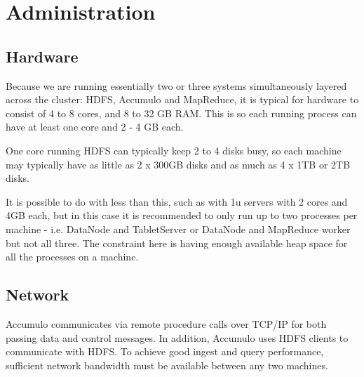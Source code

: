 
%
%

\chapter{Administration}

\section{Hardware}

Because we are running essentially two or three systems simultaneously layered
across the cluster: HDFS, Accumulo and MapReduce, it is typical for hardware to
consist of 4 to 8 cores, and 8 to 32 GB RAM. This is so each running process can have
at least one core and 2 - 4 GB each.

One core running HDFS can typically keep 2 to 4 disks busy, so each machine may
typically have as little as 2 x 300GB disks and as much as 4 x 1TB or 2TB disks.

It is possible to do with less than this, such as with 1u servers with 2 cores and 4GB
each, but in this case it is recommended to only run up to two processes per
machine - i.e. DataNode and TabletServer or DataNode and MapReduce worker but
not all three. The constraint here is having enough available heap space for all the
processes on a machine.

\section{Network}

Accumulo communicates via remote procedure calls over TCP/IP for both passing
data and control messages. In addition, Accumulo uses HDFS clients to
communicate with HDFS. To achieve good ingest and query performance, sufficient
network bandwidth must be available between any two machines.

